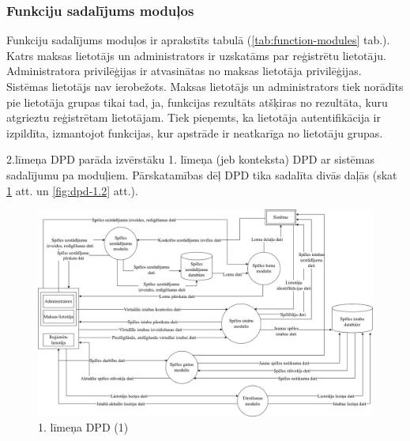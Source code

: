 \subsubsection{Funkciju sadalījums moduļos}
Funkciju sadalījums moduļos ir aprakstīts tabulā (\ref{tab:function-modules} tab.).
Katrs maksas lietotājs un administrators ir uzskatāms par reģistrētu lietotāju.
Administratora privilēģijas ir atvasinātas no maksas lietotāja privilēģijas.
Sistēmas lietotājs nav ierobežots.
Maksas lietotājs un administrators tiek norādīts pie lietotāja grupas tikai tad, ja, funkcijas rezultāts atšķiras no rezultāta, kuru atgrieztu reģistrētam lietotājam.
Tiek pieņemts, ka lietotāja autentifikācija ir izpildīta, izmantojot funkcijas, kur apstrāde ir neatkarīga no lietotāju grupas.

2.līmeņa DPD parāda izvērstāku 1. līmeņa (jeb konteksta) DPD ar sistēmas sadalījumu pa moduļiem.
Pārskatamības dēļ DPD tika sadalīta divās daļās (skat \ref{fig:dpd-1.1} att. un \ref{fig:dpd-1.2} att.).


\begin{figure}[htbp]
	\centering
	\includegraphics[width=\linewidth]{./src/img/1LīmeņaDPDSpēlesDatubāze.png}
	\caption{1. līmeņa DPD (1)}
	\label{fig:dpd-1.1}
\end{figure}

